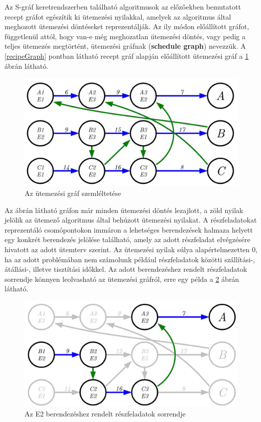 Az S-gráf keretrendszerben található algoritmusok az előzőekben bemutatott recept gráfot egészítik ki ütemezési nyilakkal, amelyek az algoritmus által meghozott ütemezési döntéseket reprezentálják.
Az ily módon előállított gráfot, függetlenül attól, hogy van-e még meghozatlan ütemezési döntés, vagy pedig a teljes ütemezés megtörtént, ütemezési gráfnak (\textbf{schedule graph}) nevezzük.
A \ref{recipeGraph} pontban látható recept gráf alapján előállított ütemezési gráf a \ref{scheduleGraph} ábrán látható.
\begin{figure}[H]
\begin{center}
\includegraphics[scale=0.3]{scheduleGraph}
\caption{Az ütemezési gráf szemléltetése}
\label{scheduleGraph}
\end{center}
\end{figure}
Az ábrán látható gráfon már minden ütemezési döntés lezajlott, a zöld nyilak jelölik az ütemező algoritmus által behúzott ütemezési nyilakat.
A részfeladatokat reprezentáló csomópontokon immáron a lehetséges berendezések halmaza helyett egy konkrét berendezés jelölése található, amely az adott részfeladat elvégzésére hivatott az adott ütemterv szerint.
Az ütemezési nyilak súlya alapértelmezetten $0$, ha az adott problémában nem számolunk például részfeladatok közötti szállítási-, átállási-, illetve tisztítási időkkel.
Az adott berendezéshez rendelt részfeladatok sorrendje könnyen leolvasható az ütemezési gráfról, erre egy példa a \ref{unitSequence} ábrán látható.
\begin{figure}[H]
\begin{center}
\includegraphics[scale=0.3]{unitSequence}
\caption{Az E2 berendezéshez rendelt részfeladatok sorrendje}
\label{unitSequence}
\end{center}
\end{figure}

